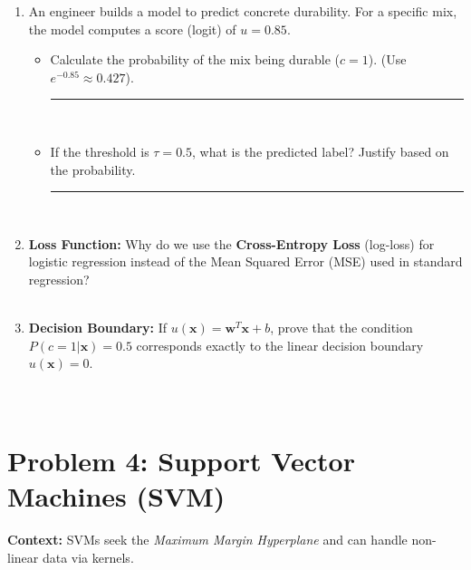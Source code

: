 \documentclass[12pt]{article}
\begin{document}
\begin{enumerate}[label=(\alph*)]
    \item An engineer builds a model to predict concrete durability. For a specific mix, the model computes a score (logit) of $u = 0.85$. 
    \begin{itemize}
        \item Calculate the probability of the mix being durable ($c=1$). (Use $e^{-0.85} \approx 0.427$). \rule{1.5in}{0.15mm} \\
        \fullunderline
        \item If the threshold is $\tau = 0.5$, what is the predicted label? Justify based on the probability. \rule{1in}{0.15mm} \\
        \fullunderline
    \end{itemize}

    \item \textbf{Loss Function:} Why do we use the \textbf{Cross-Entropy Loss} (log-loss) for logistic regression instead of the Mean Squared Error (MSE) used in standard regression? \\
    \fullunderline \\
    \fullunderline

    \item \textbf{Decision Boundary:} If $u(\bm{x}) = \bm{w}^T\bm{x} + b$, prove that the condition $P(c=1|\bm{x}) = 0.5$ corresponds exactly to the linear decision boundary $u(\bm{x}) = 0$. \\
    \fullunderline \\
    \fullunderline \\
    \fullunderline
\end{enumerate}

\section{Problem 4: Support Vector Machines (SVM)}
\textbf{Context:} SVMs seek the \textit{Maximum Margin Hyperplane} and can handle non-linear data via kernels.
\end{document}
